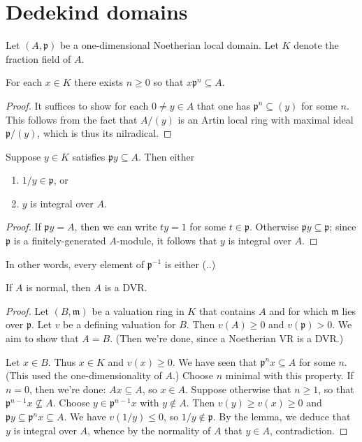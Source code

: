 \documentclass[10pt]{article}
\begin{document}
\section{Dedekind domains}
\label{sec:org0694603}

Let \((A,\mathfrak{p})\) be a one-dimensional Noetherian local
domain.  Let \(K\) denote the fraction field of \(A\).

\begin{lemma}
  For each $x \in K$ there exists $n \geq 0$ so that
  $x \mathfrak{p}^n \subseteq A$.
\end{lemma}
\begin{proof}
  It suffices to show for each $0 \neq y \in A$ that one has
  $\mathfrak{p}^n \subseteq (y)$ for some $n$.  This follows
  from the fact that $A/(y)$ is an Artin local ring with maximal
  ideal $\mathfrak{p}/(y)$, which is thus its nilradical.
\end{proof}

\begin{lemma}
  Suppose $y \in K$ satisfies
  $\mathfrak{p} y \subseteq A$.
  Then either
  \begin{enumerate}
  \item $1/y \in \mathfrak{p}$, or
  \item $y$ is integral over $A$.
  \end{enumerate}
\end{lemma}
\begin{proof}
  If $\mathfrak{p} y = A$,
  then we can write $t y = 1$ for some $t \in \mathfrak{p}$.
  Otherwise $\mathfrak{p} y \subseteq \mathfrak{p}$;
  since $\mathfrak{p}$ is a
  finitely-generated $A$-module, it follows that $y$ is integral over $A$.
\end{proof}
In other words, every element of \(\mathfrak{p}^{-1}\) is either (..)

\begin{theorem}
  If $A$ is normal, then $A$ is a DVR.
\end{theorem}
\begin{proof}
  Let $(B,\mathfrak{m})$ be a valuation ring in $K$ that
  contains $A$ and for which $\mathfrak{m}$ lies over
  $\mathfrak{p}$.  Let $v$ be a defining valuation for $B$.
  Then $v(A) \geq 0$ and $v(\mathfrak{p}) > 0$.  We aim to show
  that $A = B$.  (Then we're done, since a Noetherian VR is a
  DVR.)

  Let $x \in B$.  Thus $x \in K$ and $v(x) \geq 0$.  We have
  seen that $\mathfrak{p}^n x \subseteq A$ for some $n$.  (This
  used the one-dimensionality of $A$.)  Choose $n$ minimal with
  this property.  If $n = 0$, then we're done:
  $A x \subseteq A$, so $x \in A$.  Suppose otherwise that
  $n \geq 1$, so that $\mathfrak{p}^{n-1} x \not\subseteq A$.
  Choose $y \in \mathfrak{p}^{n-1} x$ with $y \notin A$.  Then
  $v(y) \geq v(x) \geq 0$ and
  $\mathfrak{p} y \subseteq \mathfrak{p}^n x \subseteq A$.  We
  have $v(1/y) \leq 0$, so $1/y \notin \mathfrak{p}$.  By the
  lemma, we deduce that $y$ is integral over $A$, whence by the
  normality of $A$ that $y \in A$, contradiction.
\end{proof}
\end{document}

